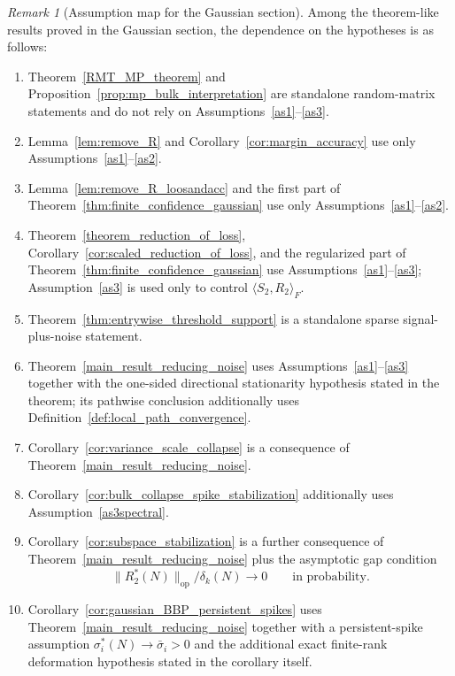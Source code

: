 \documentclass[11pt]{article}
\theoremstyle{plain}
\theoremstyle{definition}
\theoremstyle{remark}
\newtheorem{rem}[thm]{Remark}
\newcommand{\op}{\mathrm{op}}
\newcommand{\1}{\mathbf{1}}
\begin{document}
\begin{rem}[Assumption map for the Gaussian section]
Among the theorem-like results proved in the Gaussian section, the dependence on the hypotheses is as follows:
\begin{enumerate}[leftmargin=2em]
\item Theorem~\ref{RMT_MP_theorem} and Proposition~\ref{prop:mp_bulk_interpretation} are standalone random-matrix statements and do not rely on Assumptions~\ref{as1}--\ref{as3}.
\item Lemma~\ref{lem:remove_R} and Corollary~\ref{cor:margin_accuracy} use only Assumptions~\ref{as1}--\ref{as2}.
\item Lemma~\ref{lem:remove_R_loosandacc} and the first part of Theorem~\ref{thm:finite_confidence_gaussian} use only Assumptions~\ref{as1}--\ref{as2}.
\item Theorem~\ref{theorem_reduction_of_loss}, Corollary~\ref{cor:scaled_reduction_of_loss}, and the regularized part of Theorem~\ref{thm:finite_confidence_gaussian} use Assumptions~\ref{as1}--\ref{as3}; Assumption~\ref{as3} is used only to control \(\langle S_2,R_2\rangle_F\).
\item Theorem~\ref{thm:entrywise_threshold_support} is a standalone sparse signal-plus-noise statement.
\item Theorem~\ref{main_result_reducing_noise} uses Assumptions~\ref{as1}--\ref{as3} together with the one-sided directional stationarity hypothesis stated in the theorem; its pathwise conclusion additionally uses Definition~\ref{def:local_path_convergence}.
\item Corollary~\ref{cor:variance_scale_collapse} is a consequence of Theorem~\ref{main_result_reducing_noise}.
\item Corollary~\ref{cor:bulk_collapse_spike_stabilization} additionally uses Assumption~\ref{as3spectral}.
\item Corollary~\ref{cor:subspace_stabilization} is a further consequence of Theorem~\ref{main_result_reducing_noise} plus the asymptotic gap condition
\[
\|R_2^*(N)\|_{\op}/\delta_k(N)\to0
\qquad\text{in probability.}
\]
\item Corollary~\ref{cor:gaussian_BBP_persistent_spikes} uses Theorem~\ref{main_result_reducing_noise} together with a persistent-spike assumption \(\sigma_i^*(N)\to\bar\sigma_i>0\) and the additional exact finite-rank deformation hypothesis stated in the corollary itself.
\end{enumerate}
\end{rem}
\end{document}
